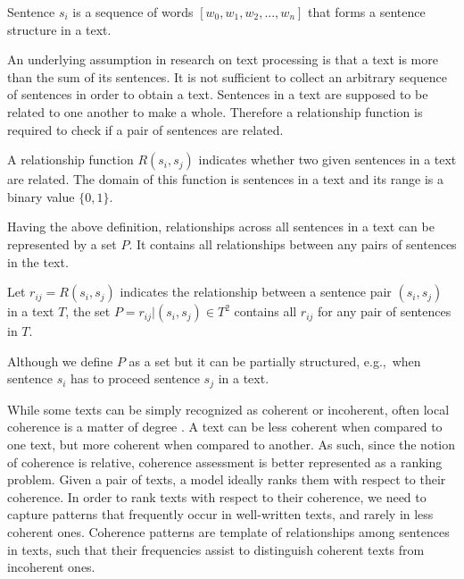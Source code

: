 \begin{definition}
Sentence $s_i$ is a sequence of words $[w_0, w_1, w_2, ... , w_n]$ that forms a sentence structure in a text. 
\end{definition}

An underlying assumption in research on text processing is that a text is more than the sum of its sentences. 
It is not sufficient to collect an arbitrary sequence of sentences in order to obtain a text. 
Sentences in a text are supposed to be related to one another to make a whole. 
Therefore a relationship function is required to check if a pair of sentences are related. 

\begin{definition}
A relationship function $R(s_i,s_j)$ indicates whether two given sentences in a text are related. 
The domain of this function is sentences in a text and its range is a binary value $\lbrace 0,1\rbrace$. 
\end{definition} 

Having the above definition, relationships across all sentences in a text can be represented by a set $P$. 
It contains all relationships between any pairs of sentences in the text. 

\begin{definition}
Let $r_{ij}= R(s_i,s_j)$ indicates the relationship between a sentence pair $(s_i,s_j)$ in a text $T$, the set $P = {r_{ij}| (s_i,s_j) \in T^2}$ contains all $r_{ij}$ for any pair of sentences in $T$.
\end{definition}  

Although we define $P$ as a set but it can be partially structured, e.g.,\ when sentence $s_i$ has to proceed sentence $s_j$ in a text. 


While some texts can be simply recognized as coherent or incoherent, often local coherence is a matter of degree \cite{halliday76}. 
A text can be less coherent when compared to one text, but more coherent when compared to another. 
As such, since the notion of coherence is relative, coherence assessment is better represented as a ranking problem. 
Given a pair of texts, a model ideally ranks them with respect to their coherence.
In order to rank texts with respect to their coherence, we need to capture patterns that frequently occur in well-written texts, and rarely in less coherent ones.  
Coherence patterns are template of relationships among sentences in texts, such that their frequencies assist to distinguish coherent texts from incoherent ones. 

